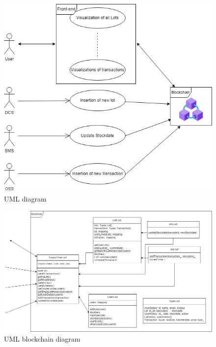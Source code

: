 \begin{figure}[ht]
    \centering
    \captionsetup[]{width=\textwidth}
    \includegraphics[width=1\textwidth, height=.8\textwidth, scale=1]{img/UML.png}
    \caption{UML diagram}
    \label{UML}
\end{figure}

\begin{figure}[ht]
    \centering
    \captionsetup[]{width=\textwidth}
    \includegraphics[width=1\textwidth, height=.5\textwidth, scale=1]{img/UMLblockchain.png}
    \caption{UML blockchain diagram}
    \label{UMLblockchain}
\end{figure}
